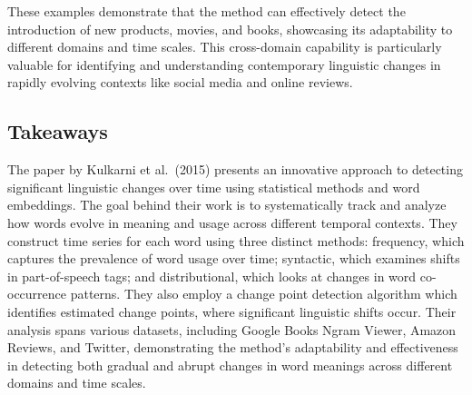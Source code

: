 These examples demonstrate that the method can effectively detect the introduction of new products, movies, and books, showcasing its adaptability to different domains and time scales.
This cross-domain capability is particularly valuable for identifying and understanding contemporary linguistic changes in rapidly evolving contexts like social media and online reviews.

\subsection{Takeaways} \label{subsec:kulkarni-takeaways}
The paper by Kulkarni et al.\ (2015) presents an innovative approach to detecting significant linguistic changes over time using statistical methods and word embeddings.
The goal behind their work is to systematically track and analyze how words evolve in meaning and usage across different temporal contexts.
They construct time series for each word using three distinct methods:
frequency, which captures the prevalence of word usage over time;
syntactic, which examines shifts in part-of-speech tags;
and distributional, which looks at changes in word co-occurrence patterns.
They also employ a change point detection algorithm which identifies estimated change points, where significant linguistic shifts occur.
Their analysis spans various datasets, including Google Books Ngram Viewer, Amazon Reviews, and Twitter,
demonstrating the method’s adaptability and effectiveness in detecting both gradual and abrupt changes in word meanings across different domains and time scales.